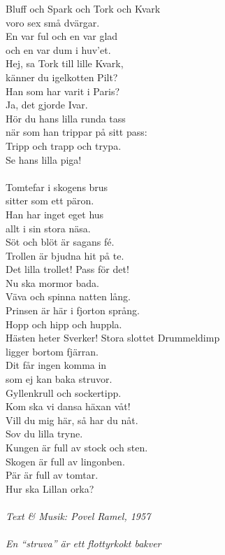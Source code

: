 \vspace{10pt}
Bluff och Spark och Tork och Kvark\\
voro sex små dvärgar.\\
En var ful och en var glad \\
och en var dum i huv'et.\\
Hej, sa Tork till lille Kvark,\\
känner du igelkotten Pilt?\\
Han som har varit i Paris?\\
Ja, det gjorde Ivar.\\
Hör du hans lilla runda tass\\
när som han trippar på sitt pass:\\
Tripp och trapp och trypa.\\
Se hans lilla piga!\\
\\
Tomtefar i skogens brus\\
sitter som ett päron.\\
Han har inget eget hus \\
allt i sin stora näsa.\\
Söt och blöt är sagans fé.\\
Trollen är bjudna hit på te.\\
Det lilla trollet! Pass för det!\\
Nu ska mormor bada.\\
Väva och spinna natten lång.\\
Prinsen är här i fjorton språng.\\
Hopp och hipp och huppla.\\
Hästen heter Sverker!
\newpage
Stora slottet Drummeldimp\\
ligger bortom fjärran.\\
Dit får ingen komma in\\
som ej kan baka struvor.\\
Gyllenkrull och sockertipp.\\
Kom ska vi dansa häxan våt!\\
Vill du mig här, så har du nåt.\\
Sov du lilla tryne.\\
Kungen är full av stock och sten.\\
Skogen är full av lingonben.\\
Pär är full av tomtar.\\
Hur ska Lillan orka?\\
\\
{\footnotesize\textit{Text \& Musik: Povel Ramel, 1957\\ \\ En
    ``struva'' är ett flottyrkokt bakver}}

